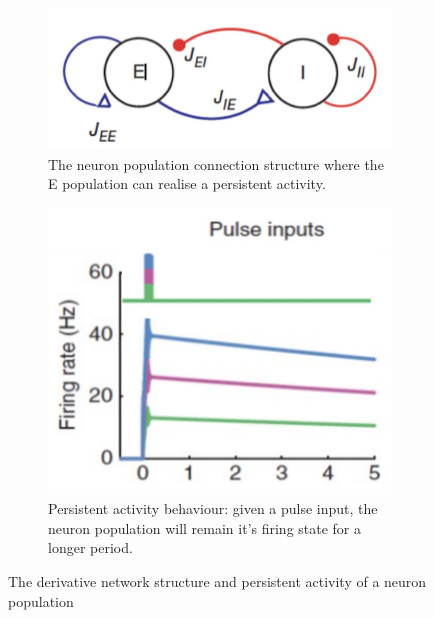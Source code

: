 \begin{figure}
	\begin{subfigure}{.5\textwidth}
		\centering
		\includegraphics[width=\columnwidth]{./img/readings/EI_balance.pdf}
		\caption{The neuron population connection structure where the E population can realise a persistent activity.}
		\label{fig:ei_structure}
	\end{subfigure}
	\begin{subfigure}{.5\textwidth}
		\centering
		\includegraphics[width=\columnwidth]{./img/readings/persistent_activity.pdf}
		\caption{Persistent activity behaviour: given a pulse input, the neuron population will remain it's firing state for a longer period.}
		\label{fig:ei_persistent}
	\end{subfigure}
	\caption{The derivative network structure\cite{limBalancedCorticalMicrocircuitry2013} and persistent activity of a neuron population}
	\label{fig:reading_ei_persistant}
\end{figure}

